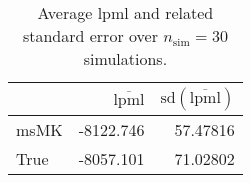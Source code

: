 \begin{table}[H]

\caption{Average lpml and related standard error over $n_{\text{sim}} = 30$ simulations.}
\centering
\begin{tabular}[t]{lrr}
\toprule
  & $\overbar{\text{lpml}}$ & $\text{sd}(\overbar{\text{lpml}})$\\
\midrule
msMK & -8122.746 & 57.47816\\
True & -8057.101 & 71.02802\\
\bottomrule
\end{tabular}
\end{table}